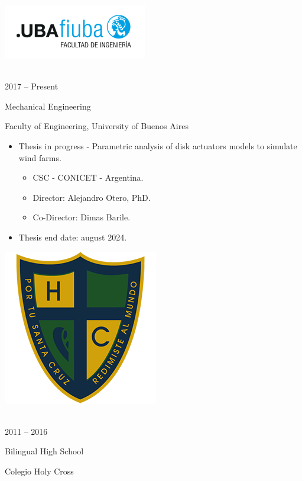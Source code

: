 \documentclass[a4paper,10pt]{article}
\newlength{\cvcolumngapwidth}
\newlength{\cvleftcolumnwidth}
\newlength{\cvrightcolumnwidth}
\newcommand{\cvtitlestyle}[1]{{\large\cvtitlefont\textcolor{cvtitlecolor}{#1}}}
\newcommand{\cvdurationstyle}[1]{{\small\cvdurationfont\textcolor{cvdurationcolor}{#1}}}
\newlength{\cvafteritemskipamount}
\newlength{\cvaftertitleskipamount}
\newlength{\cvparskip}
\newcommand{\cvitem}[2]{
    \begin{minipage}[t]{\cvleftcolumnwidth}
        \raggedleft #1
    \end{minipage}%
    \hspace{\cvcolumngapwidth}%
    \begin{minipage}[t]{\cvrightcolumnwidth}
        \setlength{\parskip}{\cvparskip} #2
    \end{minipage}

    \vspace{\cvafteritemskipamount}
}
\newcommand{\cvtitle}[1]{
    \cvtitlestyle{#1}

    \vspace{\cvaftertitleskipamount}
    \vspace{-\cvparskip}
}
\begin{document}
\cvitem{
 	\begin{minipage}{\textwidth}
   \begin{flushright}
		  \includegraphics[height=0.25\textwidth]{../logos-photos/Logo_FIUBA_new.png}   
    \end{flushright}  
  \end{minipage} \\
  \vspace{0.1cm}
  \cvdurationstyle{2017 -- Present}
}{
  \cvtitle{Mechanical Engineering}

    Faculty of Engineering, University of Buenos Aires
    
    \begin{itemize}[leftmargin=*]
      \item \textsf{Thesis in progress - Parametric analysis of disk actuators models to simulate wind farms.} 
        \begin{itemize}
          \item CSC - CONICET - Argentina.
          \item Director: Alejandro Otero, PhD.
          \item Co-Director: Dimas Barile.
        \end{itemize}
        \item Thesis end date: august 2024.
    \end{itemize}
}


\cvitem{
    \begin{minipage}{\textwidth}
        \flushright
        \includegraphics[height=0.2\textwidth]{../logos-photos/Logo_HC.png}   
    \end{minipage}\\  
    \vspace{0.1cm}
    \cvdurationstyle{2011 -- 2016}
}{
    \cvtitle{Bilingual High School}

    Colegio Holy Cross
}
\end{document}

